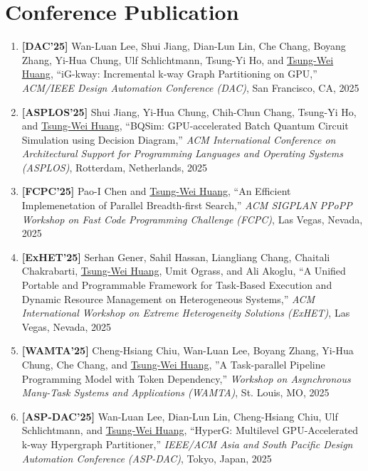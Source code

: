 \documentclass[A4,11pt]{article}
\begin{document}
\section{Conference Publication}
 \begin{enumerate}
 \itemsep-3pt

    \item \textbf{[DAC'25]} Wan-Luan Lee, Shui Jiang, Dian-Lun Lin, Che Chang, Boyang Zhang, Yi-Hua Chung, Ulf Schlichtmann, Tsung-Yi Ho, and \underline{Tsung-Wei Huang}, ``iG-kway: Incremental k-way Graph Partitioning on GPU,'' \textit{ACM/IEEE Design Automation Conference (DAC)}, San Francisco, CA, 2025

    \item \textbf{[ASPLOS'25]} Shui Jiang, Yi-Hua Chung, Chih-Chun Chang, Tsung-Yi Ho, and \underline{Tsung-Wei Huang}, ``BQSim: GPU-accelerated Batch Quantum Circuit Simulation using Decision Diagram,'' \textit{ACM International Conference on Architectural Support for Programming Languages and Operating Systems (ASPLOS)}, Rotterdam, Netherlands, 2025

    \item \textbf{[FCPC'25]} Pao-I Chen and \underline{Tsung-Wei Huang}, ``An Efficient Implemenetation of Parallel Breadth-first Search,'' \textit{ACM SIGPLAN PPoPP Workshop on Fast Code Programming Challenge (FCPC)}, Las Vegas, Nevada, 2025

    \item \textbf{[ExHET'25]} Serhan Gener, Sahil Hassan, Liangliang Chang, Chaitali Chakrabarti, \underline{Tsung-Wei Huang}, Umit Ograss, and Ali Akoglu, ``A Unified Portable and Programmable Framework for Task-Based Execution and Dynamic Resource Management on Heterogeneous Systems,'' \textit{ACM International Workshop on Extreme Heterogeneity Solutions (ExHET)}, Las Vegas, Nevada, 2025

    \item \textbf{[WAMTA'25]} Cheng-Hsiang Chiu, Wan-Luan Lee, Boyang Zhang, Yi-Hua Chung, Che Chang, and \underline{Tsung-Wei Huang}, ''A Task-parallel Pipeline Programming Model with Token Dependency,'' \textit{Workshop on Asynchronous Many-Task Systems and Applications (WAMTA)}, St. Louis, MO, 2025

    \item \textbf{[ASP-DAC'25]} Wan-Luan Lee, Dian-Lun Lin, Cheng-Hsiang Chiu, Ulf Schlichtmann, and \underline{Tsung-Wei Huang}, ``HyperG: Multilevel GPU-Accelerated k-way Hypergraph Partitioner,'' \textit{IEEE/ACM Asia and South Pacific Design Automation Conference (ASP-DAC)}, Tokyo, Japan, 2025


\end{enumerate}
\end{document}
